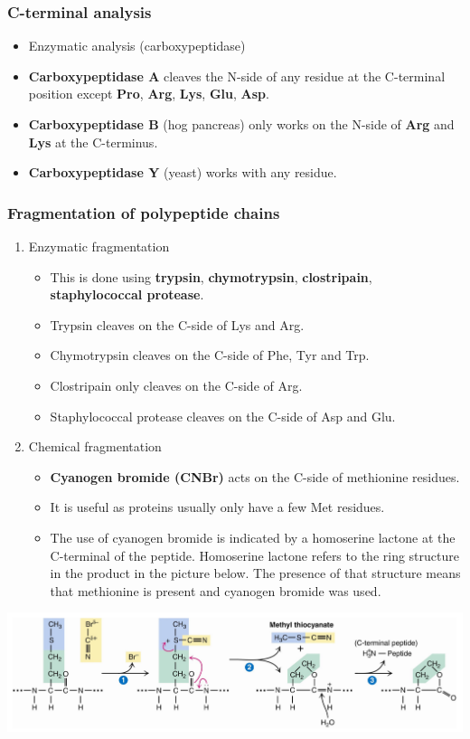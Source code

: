 \documentclass[11pt]{article}
\begin{document}
\subsubsection{C-terminal analysis}
\label{sec:org9f6e301}
\begin{itemize}
\item Enzymatic analysis (carboxypeptidase)
\item \textbf{Carboxypeptidase A} cleaves the N-side of any residue at the C-terminal position except \textbf{Pro}, \textbf{Arg}, \textbf{Lys}, \textbf{Glu}, \textbf{Asp}.
\item \textbf{Carboxypeptidase B} (hog pancreas) only works on the N-side of \textbf{Arg} and \textbf{Lys} at the C-terminus.
\item \textbf{Carboxypeptidase Y} (yeast) works with any residue.
\end{itemize}

\newpage
\subsubsection{Fragmentation of polypeptide chains}
\label{sec:org2222963}
\begin{enumerate}
\item Enzymatic fragmentation
\begin{itemize}
\item This is done using \textbf{trypsin}, \textbf{chymotrypsin}, \textbf{clostripain}, \textbf{staphylococcal protease}.
\item Trypsin cleaves on the C-side of Lys and Arg.
\item Chymotrypsin cleaves on the C-side of Phe, Tyr and Trp.
\item Clostripain only cleaves on the C-side of Arg.
\item Staphylococcal protease cleaves on the C-side of Asp and Glu.
\end{itemize}

\item Chemical fragmentation
\begin{itemize}
\item \textbf{Cyanogen bromide (CNBr)} acts on the C-side of methionine residues.
\item It is useful as proteins usually only have a few Met residues.
\item The use of cyanogen bromide is indicated by a homoserine lactone at the C-terminal of the peptide. Homoserine lactone refers to the ring structure in the product in the picture below. The presence of that structure means that methionine is present and cyanogen bromide was used.
\end{itemize}
\end{enumerate}
\begin{center}
\includegraphics[width=.9\linewidth]{./images/cyanogen-bromide-fragmentation.png}
\end{center}
\end{document}
